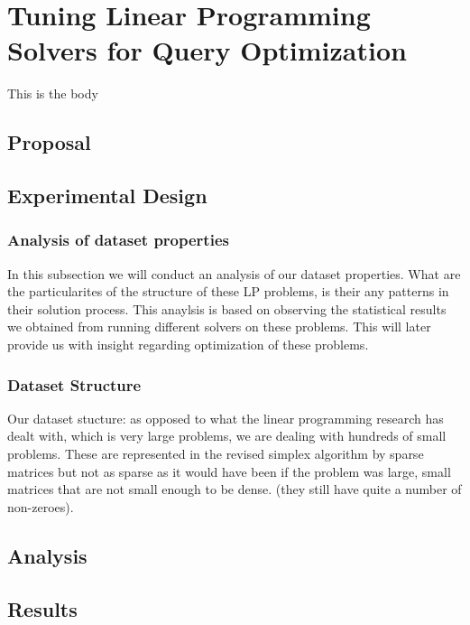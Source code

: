 
\chapter{Tuning Linear Programming Solvers for Query Optimization}\label{chapter:linearprogramming}
This is the body
\section{Proposal}

\section{Experimental Design}
\subsection{Analysis of dataset properties}
In  this subsection we will conduct an analysis of our dataset properties. What are the 
particularites of the structure of these LP problems, is their any patterns in their solution
process. This anaylsis is based on observing the statistical results we obtained from
running different solvers on these problems. This will later provide us with insight 
regarding optimization of these problems.

\subsection{Dataset Structure}
Our dataset stucture: 
as opposed to what the linear programming research has dealt with, which is 
very large problems, we are dealing with hundreds of small problems. These are represented
in the revised simplex algorithm by
sparse matrices but not as sparse as it would have been if the problem was large, 
small matrices that are not small enough to be dense. 
(they still have quite a number of non-zeroes).

\section{Analysis}

\section{Results}